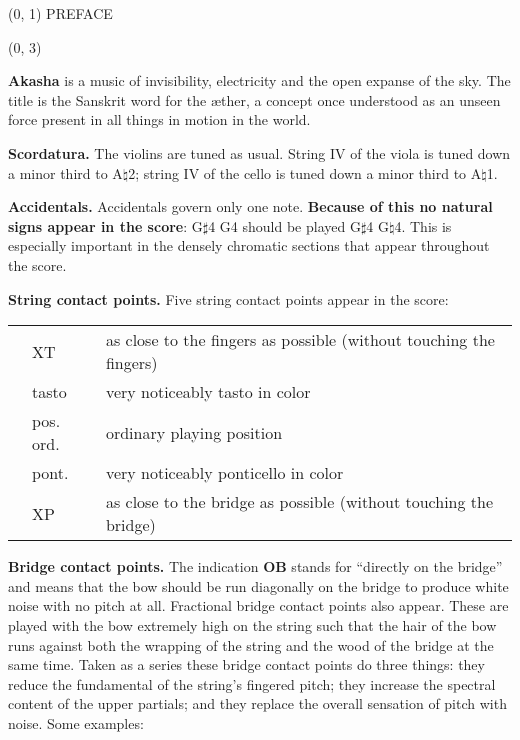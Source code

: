 \documentclass[10pt]{article}
\begin{document}
\begin{textblock}{23}(0, 1)
\center \huge PREFACE
\end{textblock}

\begin{textblock}{23}(0, 3)

\textbf{Akasha} is a music of invisibility, electricity and the open expanse of
the sky. The title is the Sanskrit word for the \ae ther, a concept once
understood as an unseen force present in all things in motion in the world.

\textbf{Scordatura.} The violins are tuned as usual. String IV of the viola is
tuned down a minor third to A$\natural$2; string IV of the cello is tuned down
a minor third to A$\natural$1.

\textbf{Accidentals.} Accidentals govern only one note. \textbf{Because of this
no natural signs appear in the score}: G$\sharp$4 G4 should be played
G$\sharp$4 G$\natural$4. This is especially important in the densely chromatic
sections that appear throughout the score.

\textbf{String contact points.} Five string contact points appear in the score:

\begin{tabu}{l l l}
\phantom{M} & XT & as close to the fingers as possible (without touching the fingers) \\
            & tasto & very noticeably tasto in color\\
            & pos. ord. & ordinary playing position \\
            & pont. & very noticeably ponticello in color \\
            & XP & as close to the bridge as possible (without touching the bridge) \\
\end{tabu}

\textbf{Bridge contact points.} The indication \textbf{OB} stands for
``directly on the bridge'' and means that the bow should be run diagonally on
the bridge to produce white noise with no pitch at all. Fractional bridge
contact points also appear. These are played with the bow extremely high on the
string such that the hair of the bow runs against both the wrapping of the
string and the wood of the bridge at the same time. Taken as a series these
bridge contact points do three things: they reduce the
fundamental of the string's fingered pitch; they increase the spectral content
of the upper partials; and they replace the overall sensation of pitch with
noise. Some examples:


\end{textblock}
\end{document}

